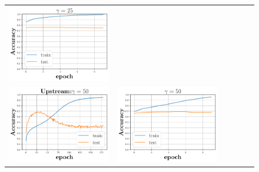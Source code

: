 \begin{figure}[h]
\begin{minipage}{0.99\columnwidth}
{\begin{tabular}{cccccc}
\includegraphics[scale=0.125]{figs/galu_25_recovered.pdf}
\\
\includegraphics[scale=0.125]{figs/relu_50.pdf}&
\includegraphics[scale=0.125]{figs/galu_50_good.pdf}&

\end{tabular}}
\end{minipage}
\end{figure}
